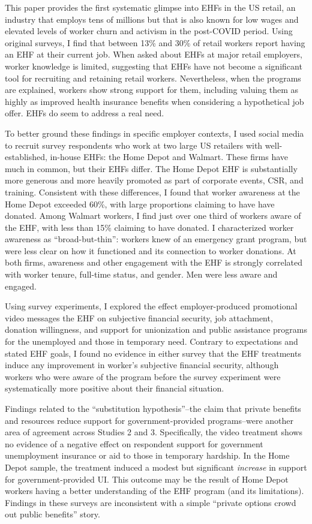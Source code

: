 \documentclass[
  11pt,
  oneside]{article}
\begin{document}
This paper provides the first systematic glimpse into EHFs in the US retail, an industry that employs tens of millions but that is also known for low wages and elevated levels of worker churn and activism in the post-COVID period. Using original surveys, I find that between 13\% and 30\% of retail workers report having an EHF at their current job. When asked about EHFs at major retail employers, worker knowledge is limited, suggesting that EHFs have not become a significant tool for recruiting and retaining retail workers. Nevertheless, when the programs are explained, workers show strong support for them, including valuing them as highly as improved health insurance benefits when considering a hypothetical job offer. EHFs do seem to address a real need.

To better ground these findings in specific employer contexts, I used social media to recruit survey respondents who work at two large US retailers with well-established, in-house EHFs: the Home Depot and Walmart. These firms have much in common, but their EHFs differ. The Home Depot EHF is substantially more generous and more heavily promoted as part of corporate events, CSR, and training. Consistent with these differences, I found that worker awareness at the Home Depot exceeded 60\%, with large proportions claiming to have have donated. Among Walmart workers, I find just over one third of workers aware of the EHF, with less than 15\% claiming to have donated. I characterized worker awareness as ``broad-but-thin'': workers knew of an emergency grant program, but were less clear on how it functioned and its connection to worker donations. At both firms, awareness and other engagement with the EHF is strongly correlated with worker tenure, full-time status, and gender. Men were less aware and engaged.

Using survey experiments, I explored the effect employer-produced promotional video messages the EHF on subjective financial security, job attachment, donation willingness, and support for unionization and public assistance programs for the unemployed and those in temporary need. Contrary to expectations and stated EHF goals, I found no evidence in either survey that the EHF treatments induce any improvement in worker's subjective financial security, although workers who were aware of the program before the survey experiment were systematically more positive about their financial situation.

Findings related to the ``substitution hypothesis''--the claim that private benefits and resources reduce support for government-provided programs--were another area of agreement across Studies 2 and 3. Specifically, the video treatment shows no evidence of a negative effect on respondent support for government unemployment insurance or aid to those in temporary hardship. In the Home Depot sample, the treatment induced a modest but significant \emph{increase} in support for government-provided UI. This outcome may be the result of Home Depot workers having a better understanding of the EHF program (and its limitations). Findings in these surveys are inconsistent with a simple ``private options crowd out public benefits'' story.
\end{document}
